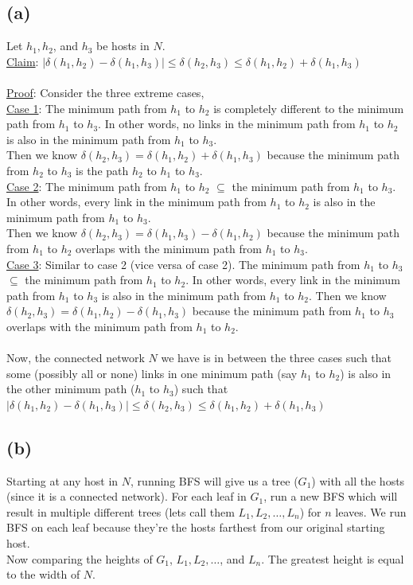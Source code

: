 \documentclass{article}
\begin{document}
\subsection*{(a)} 
Let $h_1, h_2$, and $h_3$ be hosts in $N$.\\
\underline{Claim}: $|\delta(h_1, h_2) - \delta(h_1, h_3)| \leq \delta(h_2, h_3) \leq \delta(h_1, h_2) + \delta(h_1, h_3)$\\~\\
\underline{Proof}:
Consider the three extreme cases,\\
\underline{Case 1}: The minimum path from $h_1$ to $h_2$ is completely different to the minimum path from $h_1$ to $h_3$. 
In other words, no links in the minimum path from $h_1$ to $h_2$ is also in the minimum path from $h_1$ to $h_3$. \\
Then we know $\delta(h_2, h_3) = \delta(h_1, h_2) + \delta(h_1, h_3)$ because the minimum path from $h_2$ to $h_3$ is the path $h_2$ to $h_1$ to $h_3$.\\
\underline{Case 2}: The minimum path from $h_1$ to $h_2$ $\subseteq$ the minimum path from $h_1$ to $h_3$. \\
In other words, every link in the minimum path from $h_1$ to $h_2$ is also in the minimum path from $h_1$ to $h_3$.\\
Then we know $\delta(h_2, h_3) = \delta(h_1, h_3) - \delta(h_1, h_2)$ because the minimum path from $h_1$ to $h_2$ overlaps with the minimum path from $h_1$ to $h_3$.\\
\underline{Case 3}: Similar to case 2 (vice versa of case 2). The minimum path from $h_1$ to $h_3$ $\subseteq$ the minimum path from $h_1$ to $h_2$. 
In other words, every link in the minimum path from $h_1$ to $h_3$ is also in the minimum path from $h_1$ to $h_2$.
Then we know $\delta(h_2, h_3) = \delta(h_1, h_2) - \delta(h_1, h_3)$ because the minimum path from $h_1$ to $h_3$ overlaps with the minimum path from $h_1$ to $h_2$.\\~\\
Now, the connected network $N$ we have is in between the three cases such that some (possibly all or none) links in one minimum path (say $h_1$ to $h_2$) is also in the other minimum path ($h_1$ to $h_3$) such that $|\delta(h_1, h_2) - \delta(h_1, h_3)| \leq \delta(h_2, h_3) \leq \delta(h_1, h_2) + \delta(h_1, h_3)$
\subsection*{(b)} 
Starting at any host in $N$, running BFS will give us a tree ($G_1$) with all the hosts (since it is a connected network). For each leaf in $G_1$, run a new BFS which will result in multiple different trees (lets call them $L_1, L_2, \dots, L_n$) for $n$ leaves. We run BFS on each leaf because they're the hosts farthest from our original starting host.\\
Now comparing the heights of $G_1$, $L_1, L_2, \dots$, and $L_n$. The greatest height is equal to the width of $N$.
\end{document}
